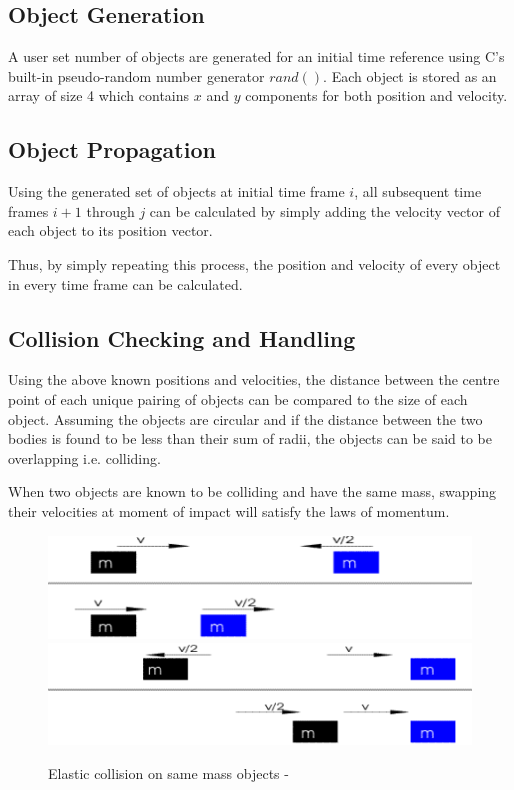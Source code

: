 \documentclass[twoside,twocolumn]{article}
\begin{document}
	\subsection{Object Generation}
	A user set number of objects are generated for an initial time reference using C's built-in pseudo-random number generator $rand()$.\newline
	Each object is stored as an array of size 4 which contains $x$ and $y$ components for both position and velocity.\newline
	
	\subsection{Object Propagation}
	Using the generated set of objects at initial time frame $i$, all subsequent time frames $i+1$ through $j$ can be calculated by simply adding the velocity vector of each object to its position vector.\newline
	
	Thus, by simply repeating this process, the position and velocity of every object in every time frame can be calculated.
	
	\subsection{Collision Checking and Handling}
	Using the above known positions and velocities, the distance between the centre point of each unique pairing of objects can be compared to the size of each object. Assuming the objects are circular and if the distance between the two bodies is found to be less than their sum of radii, the objects can be said to be overlapping i.e. colliding. \newline
	
	When two objects are known to be colliding and have the same mass, swapping their velocities at moment of impact will satisfy the laws of momentum.\newline
	\begin{figure}
	\caption{Elastic collision on same mass objects - \cite{gif:1}}
	\includegraphics[scale=.6]{pic1.png}
	\newline
	\includegraphics[scale=.6]{pic2.png}
	
	\end{figure}
	
\end{document}
